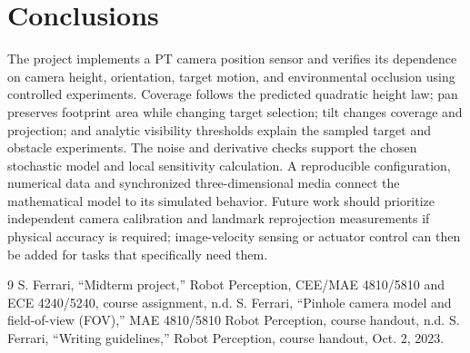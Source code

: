 \documentclass[11pt,letterpaper]{article}
\begin{document}
\section{Conclusions}
The project implements a PT camera position sensor and verifies its dependence on camera height, orientation, target motion, and environmental occlusion using controlled experiments. Coverage follows the predicted quadratic height law; pan preserves footprint area while changing target selection; tilt changes coverage and projection; and analytic visibility thresholds explain the sampled target and obstacle experiments. The noise and derivative checks support the chosen stochastic model and local sensitivity calculation. A reproducible configuration, numerical data and synchronized three-dimensional media connect the mathematical model to its simulated behavior. Future work should prioritize independent camera calibration and landmark reprojection measurements if physical accuracy is required; image-velocity sensing or actuator control can then be added for tasks that specifically need them.

\begin{thebibliography}{9}
 S. Ferrari, ``Midterm project,'' Robot Perception, CEE/MAE 4810/5810 and ECE 4240/5240, course assignment, n.d.
 S. Ferrari, ``Pinhole camera model and field-of-view (FOV),'' MAE 4810/5810 Robot Perception, course handout, n.d.
 S. Ferrari, ``Writing guidelines,'' Robot Perception, course handout, Oct. 2, 2023.
\end{thebibliography}
\end{document}
